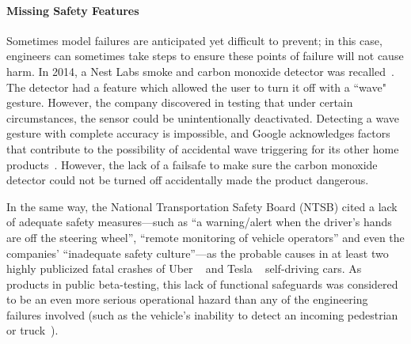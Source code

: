 \documentclass[acmconf,manuscript,screen,natbib=true]{acmart}
\begin{document}



\paragraph{Missing Safety Features}

Sometimes model failures are anticipated yet difficult to prevent; in this case, engineers can sometimes take steps to ensure these points of failure will not cause harm. In 2014, a Nest Labs smoke and carbon monoxide detector was recalled~\cite{nest}. The detector had a feature which allowed the user to turn it off with a ``wave" gesture. However, the company discovered in testing that under certain circumstances, the sensor could be unintentionally deactivated. Detecting a wave gesture with complete accuracy is impossible, and Google acknowledges factors that contribute to the possibility of accidental wave triggering for its other home products~\cite{google_nest_help}. However, the lack of a failsafe to make sure the carbon monoxide detector could not be turned off accidentally made the product dangerous.

In the same way, the National Transportation Safety Board (NTSB) cited a lack of adequate safety measures---such as ``a warning/alert when the driver’s hands are off the steering wheel'', ``remote monitoring of vehicle operators'' and even the companies’ ``inadequate safety culture''---as the probable causes in at least two highly publicized fatal crashes of Uber ~\cite{uber-crash, uber-crash-2} and Tesla ~\cite{tesla-crash,tesla-crash-2} self-driving cars. As products in public beta-testing, this lack of functional safeguards was considered to be an even more serious operational hazard than any of the engineering failures involved (such as the vehicle's inability to detect an incoming pedestrian~\cite{uber-crash} or truck~\cite{tesla-crash}). 
\end{document}
